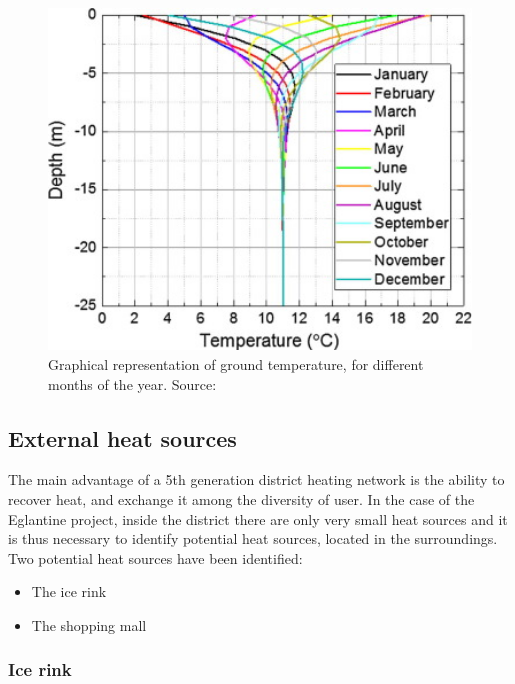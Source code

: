 \documentclass{article}
\begin{document}
\begin{figure}[h!]
\centering
\includegraphics[width=1\textwidth]{GTW_temp.jpg}
\caption{Graphical representation of ground temperature, for different months of the year. Source: \cite{hanSensitivityAnalysisVertical2016}}
\label{fig:GTW_temp}
\end{figure}

\subsection{External heat sources}
The main advantage of a 5th generation district heating network is the ability to recover heat, and exchange it among the diversity of user. In the case of the Eglantine project, inside the district there are only very small heat sources and it is thus necessary to identify potential heat sources, located in the surroundings. 
Two potential heat sources have been identified:
\begin{itemize}
    \item The ice rink
    \item The shopping mall
\end{itemize}

\subsubsection{Ice rink}
\end{document}
